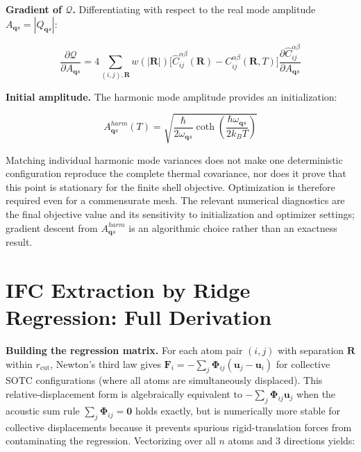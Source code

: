\documentclass[aps,prb,reprint,amsmath,amssymb,floatfix]{revtex4-2}
\begin{document}
\textbf{Gradient of \(\mathcal{Q}\).} Differentiating with respect to
the real mode amplitude \(A_{\mathbf{q}s} = |Q_{\mathbf{q}s}|\):

{\small
\begin{equation*}
\frac{\partial\mathcal{Q}}{\partial A_{\mathbf{q}s}} = 4\sum_{(i,j),\mathbf{R}} w(|\mathbf{R}|)\bigl[\hat{C}_{ij}^{\alpha\beta}(\mathbf{R}) - C_{ij}^{\alpha\beta}(\mathbf{R},T)\bigr]\frac{\partial\hat{C}_{ij}^{\alpha\beta}}{\partial A_{\mathbf{q}s}}
\end{equation*}
}

\color{revisionblue}
\textbf{Initial amplitude.} The harmonic mode amplitude provides an
initialization:
\color{black}

\begin{equation*}
A_{\mathbf{q}s}^{harm}(T) = \sqrt{\frac{\hbar}{2\omega_{\mathbf{q}s}}\coth\!\left(\frac{\hbar\omega_{\mathbf{q}s}}{2k_BT}\right)}
\end{equation*}

\color{revisionblue}
Matching individual harmonic mode variances does not make one deterministic
configuration reproduce the complete thermal covariance, nor does it prove
that this point is stationary for the finite shell objective. Optimization is therefore required even for a commensurate mesh. The relevant
numerical diagnostics are the final objective value and its sensitivity to
initialization and optimizer settings; gradient descent from
\(A_{\mathbf{q}s}^{harm}\) is an algorithmic choice rather than an exactness
result.
\color{black}

\section{IFC Extraction by Ridge Regression: Full
Derivation}\label{appendix-d-ifc-extraction-by-ridge-regression-full-derivation}

\textbf{Building the regression matrix.} For each atom pair \((i,j)\)
with separation \(\mathbf{R}\) within \(r_\text{cut}\), Newton's third
law gives
\(\mathbf{F}_i = -\sum_{j}\boldsymbol{\Phi}_{ij}(\mathbf{u}_j - \mathbf{u}_i)\)
for collective SOTC configurations (where all atoms are simultaneously
displaced). This relative-displacement form is algebraically equivalent
to \(-\sum_j\boldsymbol{\Phi}_{ij}\mathbf{u}_j\) when the acoustic sum
rule \(\sum_j\boldsymbol{\Phi}_{ij} = \mathbf{0}\) holds exactly, but is
numerically more stable for collective displacements because it prevents
spurious rigid-translation forces from contaminating the regression.
Vectorizing over all \(n\) atoms and 3 directions yields:
\end{document}
